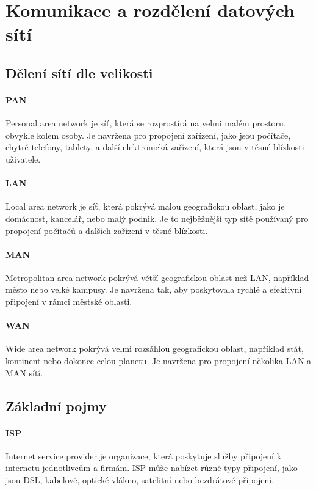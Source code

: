 \section{Komunikace a rozdělení datových sítí}

\subsection{Dělení sítí dle velikosti}
\paragraph{PAN}
Personal area network je síť, která se rozprostírá na velmi malém prostoru, obvykle kolem osoby. Je navržena pro propojení zařízení, jako jsou počítače, chytré telefony, tablety, a další elektronická zařízení, která jsou v těsné blízkosti uživatele.
\paragraph{LAN}
Local area network je síť, která pokrývá malou geografickou oblast, jako je domácnost, kancelář, nebo malý podnik. Je to nejběžnější typ sítě používaný pro propojení počítačů a dalších zařízení v těsné blízkosti.
\paragraph{MAN}
Metropolitan area network pokrývá větší geografickou oblast než LAN, například město nebo velké kampusy. Je navržena tak, aby poskytovala rychlé a efektivní připojení v rámci městské oblasti.
\paragraph{WAN}
Wide area network pokrývá velmi rozsáhlou geografickou oblast, například stát, kontinent nebo dokonce celou planetu. Je navržena pro propojení několika LAN a MAN sítí.

\subsection{Základní pojmy}
\paragraph{ISP}
Internet service provider je organizace, která poskytuje služby připojení k internetu jednotlivcům a firmám. ISP může nabízet různé typy připojení, jako jsou DSL, kabelové, optické vlákno, satelitní nebo bezdrátové připojení.
